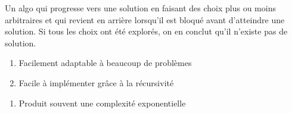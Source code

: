  Un algo qui progresse vers une solution en faisant des choix plus ou moins arbitraires et qui revient en arrière lorsqu'il est bloqué avant d'atteindre une solution. Si tous les choix ont été explorés, on en conclut qu'il n'existe pas de solution. \\

\begin{enumerate} 
	\item Facilement adaptable à beaucoup de problèmes 
	\item Facile à implémenter grâce à la récursivité
\end{enumerate}

\begin{enumerate} 
	\item Produit souvent une complexité exponentielle
\end{enumerate}

 \\


